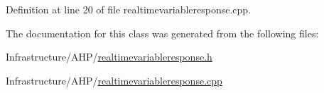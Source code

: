 Definition at line 20 of file realtimevariableresponse.\+cpp.



The documentation for this class was generated from the following files\+:\begin{DoxyCompactItemize}
\item 
Infrastructure/\+A\+H\+P/\hyperlink{realtimevariableresponse_8h}{realtimevariableresponse.\+h}\item 
Infrastructure/\+A\+H\+P/\hyperlink{realtimevariableresponse_8cpp}{realtimevariableresponse.\+cpp}\end{DoxyCompactItemize}
